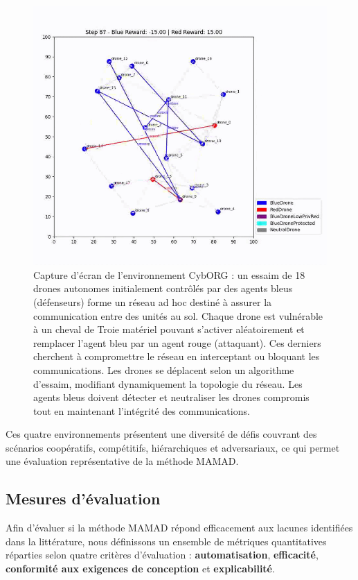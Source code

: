\documentclass[pdflatex,sn-mathphys-num]{sn-jnl}%
\theoremstyle{thmstyleone}%
\theoremstyle{thmstyletwo}%
\theoremstyle{thmstylethree}%
\begin{document}
\begin{figure}[h!]
    \centering
    \includegraphics[width=0.6\linewidth]{figures/cyborg.png}
    \caption{Capture d'écran de l'environnement CybORG : un essaim de 18 drones autonomes initialement contrôlés par des agents bleus (défenseurs) forme un réseau ad hoc destiné à assurer la communication entre des unités au sol. Chaque drone est vulnérable à un cheval de Troie matériel pouvant s'activer aléatoirement et remplacer l'agent bleu par un agent rouge (attaquant). Ces derniers cherchent à compromettre le réseau en interceptant ou bloquant les communications. Les drones se déplacent selon un algorithme d'essaim, modifiant dynamiquement la topologie du réseau. Les agents bleus doivent détecter et neutraliser les drones compromis tout en maintenant l'intégrité des communications.}
    \label{fig:cyborg}
\end{figure}

\bigskip

\noindent Ces quatre environnements présentent une diversité de défis couvrant des scénarios coopératifs, compétitifs, hiérarchiques et adversariaux, ce qui permet une évaluation représentative de la méthode MAMAD.


\subsection{Mesures d'évaluation}

Afin d'évaluer si la méthode MAMAD répond efficacement aux lacunes identifiées dans la littérature, nous définissons un ensemble de métriques quantitatives réparties selon quatre critères d'évaluation : \textbf{automatisation}, \textbf{efficacité}, \textbf{conformité aux exigences de conception} et \textbf{explicabilité}.
\end{document}
